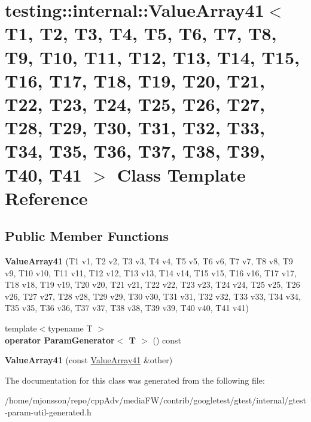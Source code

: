 \hypertarget{classtesting_1_1internal_1_1ValueArray41}{}\section{testing\+:\+:internal\+:\+:Value\+Array41$<$ T1, T2, T3, T4, T5, T6, T7, T8, T9, T10, T11, T12, T13, T14, T15, T16, T17, T18, T19, T20, T21, T22, T23, T24, T25, T26, T27, T28, T29, T30, T31, T32, T33, T34, T35, T36, T37, T38, T39, T40, T41 $>$ Class Template Reference}
\label{classtesting_1_1internal_1_1ValueArray41}
\subsection*{Public Member Functions}
\begin{DoxyCompactItemize}
\item 
\mbox{\label{classtesting_1_1internal_1_1ValueArray41_a83f8e5d2b513922000c12e549600637b}} 
{\bfseries Value\+Array41} (T1 v1, T2 v2, T3 v3, T4 v4, T5 v5, T6 v6, T7 v7, T8 v8, T9 v9, T10 v10, T11 v11, T12 v12, T13 v13, T14 v14, T15 v15, T16 v16, T17 v17, T18 v18, T19 v19, T20 v20, T21 v21, T22 v22, T23 v23, T24 v24, T25 v25, T26 v26, T27 v27, T28 v28, T29 v29, T30 v30, T31 v31, T32 v32, T33 v33, T34 v34, T35 v35, T36 v36, T37 v37, T38 v38, T39 v39, T40 v40, T41 v41)
\item 
\mbox{\label{classtesting_1_1internal_1_1ValueArray41_ad4a6f0ae2c80319295c2c2eedd1aa382}} 
{\footnotesize template$<$typename T $>$ }\\{\bfseries operator Param\+Generator$<$ T $>$} () const
\item 
\mbox{\label{classtesting_1_1internal_1_1ValueArray41_ab145f0ee0fad96b815fc3742a6c15204}} 
{\bfseries Value\+Array41} (const \hyperlink{classtesting_1_1internal_1_1ValueArray41}{Value\+Array41} \&other)
\end{DoxyCompactItemize}


The documentation for this class was generated from the following file\+:\begin{DoxyCompactItemize}
\item 
/home/mjonsson/repo/cpp\+Adv/media\+F\+W/contrib/googletest/gtest/internal/gtest-\/param-\/util-\/generated.\+h\end{DoxyCompactItemize}
